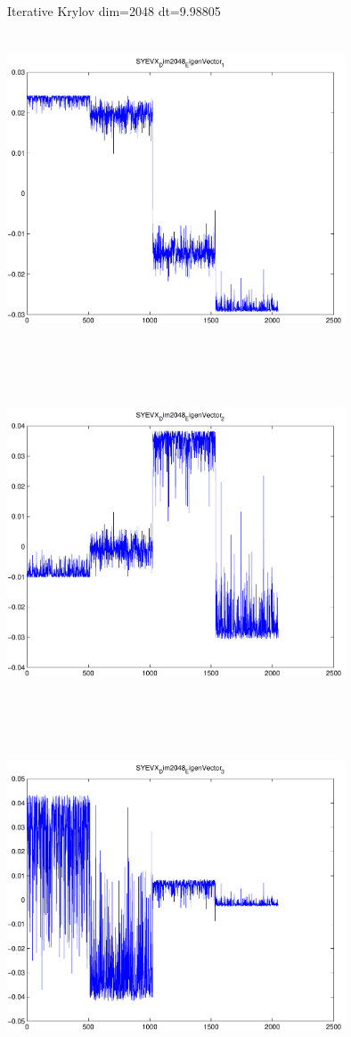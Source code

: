 \documentclass[9pt]{article}
\theoremstyle{plain}
\theoremstyle{definition}
\theoremstyle{remark}
\numberwithin{equation}{section}
\begin{document}
Iterative Krylov dim=2048 dt=9.98805
\includegraphics[width=10.0cm,height=10.0cm]{SYEVX_Dim2048_EigenVector_1.pdf}

\includegraphics[width=10.0cm,height=10.0cm]{SYEVX_Dim2048_EigenVector_2.pdf}

\includegraphics[width=10.0cm,height=10.0cm]{SYEVX_Dim2048_EigenVector_3.pdf}
\end{document}
